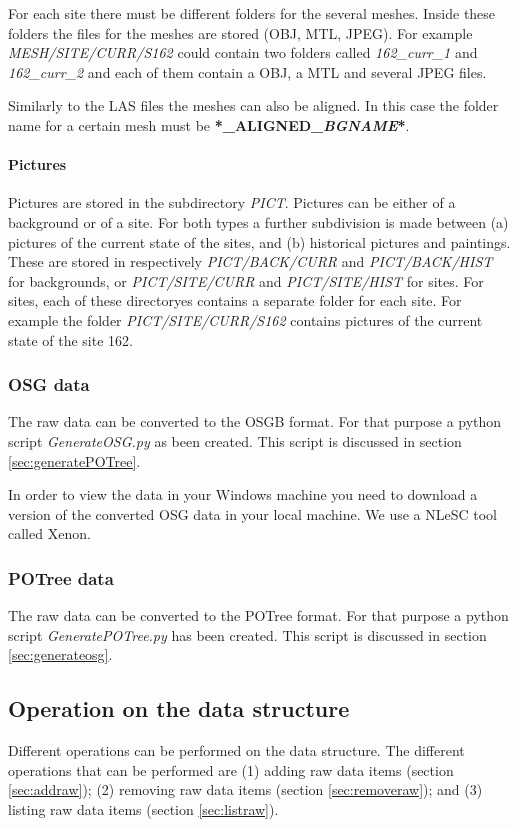 For each site there must be different folders for the several meshes. Inside these folders the files for the meshes are stored (OBJ, MTL, JPEG). For example \textit{MESH/SITE/CURR/S162} could contain two folders called \textit{162\_curr\_1} and \textit{162\_curr\_2} and each of them contain a OBJ, a MTL and several JPEG files. 

Similarly to the LAS files the meshes can also be aligned. In this case the folder name for a certain mesh must be \textbf{*\_ALIGNED\_\textit{BGNAME}*}. 

\paragraph{Pictures}
Pictures are stored in the subdirectory \textit{PICT}. Pictures can be either of a background or of a site. For both types a further subdivision is made between (a) pictures of the current state of the sites, and (b) historical pictures and paintings. These are stored in respectively \textit{PICT/BACK/CURR} and \textit{PICT/BACK/HIST} for backgrounds, or \textit{PICT/SITE/CURR} and \textit{PICT/SITE/HIST} for sites. For sites, each of these directoryes contains a separate folder for each site. For example the folder \textit{PICT/SITE/CURR/S162} contains pictures of the current state of the site 162.

\subsubsection{OSG data}
The raw data can be converted to the OSGB format. For that purpose a python script \textit{GenerateOSG.py} as been created. This script is discussed in section \ref{sec:generatePOTree}. 

In order to view the data in your Windows machine you need to download a version of the converted OSG data in your local machine. We use a NLeSC tool called Xenon.

\subsubsection{POTree data}
The raw data can be converted to the POTree format. For that purpose a python script \textit{GeneratePOTree.py} has been created. This script is discussed in section \ref{sec:generateosg}.

\subsection{Operation on the data structure}
Different operations can be performed on the data structure. The different operations that can be performed are (1) adding raw data items (section \ref{sec:addraw}); (2) removing raw data items (section \ref{sec:removeraw}); and (3) listing raw data items (section \ref{sec:listraw}).

